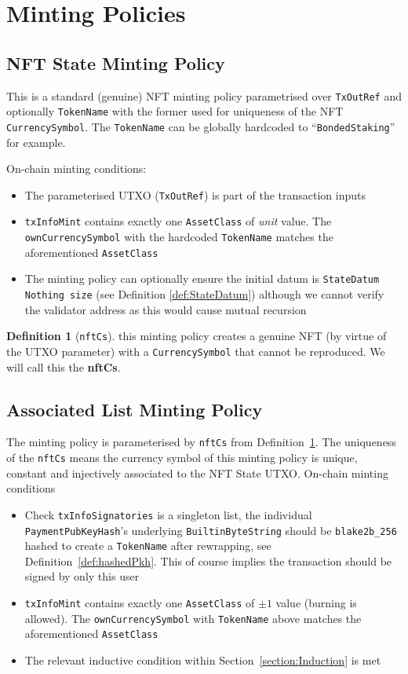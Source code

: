 \documentclass[10pt, a4paper]{article}
\theoremstyle{definition}
\newtheorem{definition}{Definition}[section]
\begin{document}
\section{Minting Policies}\label{section:MintingPolicies}
\subsection{NFT State Minting Policy}\label{subsection:NFTStateMintingPolicy}
This is a standard (genuine) NFT minting policy parametrised over \texttt{TxOutRef} and optionally \texttt{TokenName} with the former used for uniqueness of the NFT \texttt{CurrencySymbol}. The \texttt{TokenName} can be globally hardcoded to ``\texttt{BondedStaking}'' for example.

On-chain minting conditions:
\begin{itemize}
\item{The parameterised UTXO (\texttt{TxOutRef}) is part of the transaction inputs}
\item{\texttt{txInfoMint} contains exactly one \texttt{AssetClass} of \textit{unit} value. The \texttt{ownCurrencySymbol} with the hardcoded \texttt{TokenName} matches the aforementioned \texttt{AssetClass}}
\item{The minting policy can optionally ensure the initial datum is \texttt{StateDatum Nothing size} (see Definition \ref{def:StateDatum}) although we cannot verify the validator address as this would cause mutual recursion}
\end{itemize}
\begin{definition}[\texttt{nftCs}]\label{def:nftCs} this minting policy creates a genuine NFT (by virtue of the UTXO parameter) with a \texttt{CurrencySymbol} that cannot be reproduced. We will call this the \textbf{nftCs}.
\end{definition}

\subsection{Associated List Minting Policy}\label{subsection:AssociatedListMintingPolicy}
The minting policy is parameterised by \texttt{nftCs} from Definition~\ref{def:nftCs}. The uniqueness of the \texttt{nftCs} means the currency symbol of this minting policy is unique, constant and injectively associated to the NFT State UTXO.
On-chain minting conditions
\begin{itemize}
\item{Check \texttt{txInfoSignatories} is a singleton list, the individual \texttt{PaymentPubKeyHash}'s underlying \texttt{BuiltinByteString} should be \texttt{blake2b\_256} hashed to create a \texttt{TokenName} after rewrapping, see Definition~\ref{def:hashedPkh}. This of course implies the transaction should be signed by only this user}
\item{\texttt{txInfoMint} contains exactly one \texttt{AssetClass} of $\pm 1$ value (burning is allowed). The \texttt{ownCurrencySymbol} with \texttt{TokenName} above matches the aforementioned \texttt{AssetClass}}
\item{The relevant inductive condition within Section~\ref{section:Induction} is met}
\end{itemize}
\end{document}
